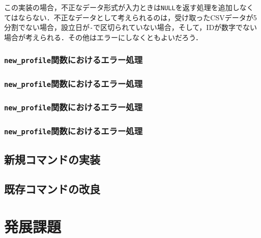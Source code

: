 \documentclass[a4j,11pt]{jarticle}
\begin{document}
この実装の場合，不正なデータ形式が入力ときは\verb|NULL|を返す処理を追加しなくてはならない．不正なデータとして考えられるのは，受け取ったCSVデータが5分割でない場合，設立日が\verb|-|で区切られていない場合，そして，IDが数字でない場合が考えられる．その他はエラーにしなくともよいだろう．
\subsubsection{\texttt{new\_profile}関数におけるエラー処理}
\subsubsection{\texttt{new\_profile}関数におけるエラー処理}
\subsubsection{\texttt{new\_profile}関数におけるエラー処理}
\subsubsection{\texttt{new\_profile}関数におけるエラー処理}

\subsection{新規コマンドの実装}
\subsection{既存コマンドの改良}

\section{発展課題}\label{sec:hatten}
\end{document}
